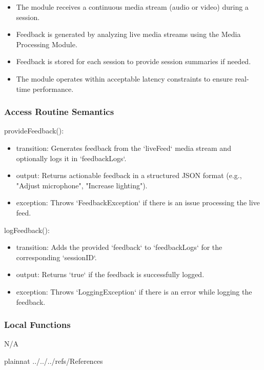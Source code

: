 \documentclass[12pt, titlepage]{article}
\begin{document}
\begin{itemize}
\item The module receives a continuous media stream (audio or video) during a session.
\item Feedback is generated by analyzing live media streams using the Media Processing Module.
\item Feedback is stored for each session to provide session summaries if needed.
\item The module operates within acceptable latency constraints to ensure real-time performance.
\end{itemize}

\subsubsection{Access Routine Semantics}

\noindent provideFeedback():
\begin{itemize}
\item transition: Generates feedback from the `liveFeed` media stream and optionally logs it in `feedbackLogs`.
\item output: Returns actionable feedback in a structured JSON format (e.g., "Adjust microphone", "Increase lighting").
\item exception: Throws `FeedbackException` if there is an issue processing the live feed.
\end{itemize}

\noindent logFeedback():
\begin{itemize}
\item transition: Adds the provided `feedback` to `feedbackLogs` for the corresponding `sessionID`.
\item output: Returns `true` if the feedback is successfully logged.
\item exception: Throws `LoggingException` if there is an error while logging the feedback.
\end{itemize}

\subsubsection{Local Functions}

N/A



\newpage

 {plainnat}
 {../../../refs/References}

\newpage
\end{document}
